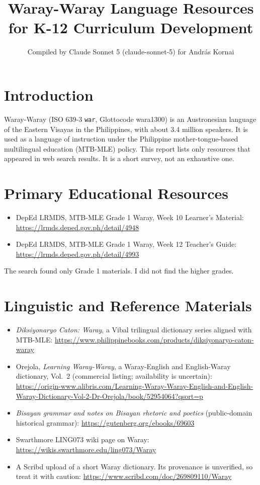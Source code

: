 \documentclass[12pt]{article}
\title{Waray-Waray Language Resources for K-12 Curriculum Development}
\author{Compiled by Claude Sonnet 5 (claude-sonnet-5) for Andr\'as Kornai}
\date{}
\begin{document}
\maketitle

\section{Introduction}
Waray-Waray (ISO 639-3 \texttt{war}, Glottocode wara1300) is an Austronesian language of the Eastern Visayas in the Philippines, with about 3.4 million speakers. It is used as a language of instruction under the Philippine mother-tongue-based multilingual education (MTB-MLE) policy. This report lists only resources that appeared in web search results. It is a short survey, not an exhaustive one.

\section{Primary Educational Resources}
\begin{itemize}
\item DepEd LRMDS, MTB-MLE Grade 1 Waray, Week 10 Learner's Material: \url{https://lrmds.deped.gov.ph/detail/4948}
\item DepEd LRMDS, MTB-MLE Grade 1 Waray, Week 12 Teacher's Guide: \url{https://lrmds.deped.gov.ph/detail/4993}
\end{itemize}
The search found only Grade 1 materials. I did not find the higher grades.

\section{Linguistic and Reference Materials}
\begin{itemize}
\item \emph{Diksiyonaryo Caton: Waray}, a Vibal trilingual dictionary series aligned with MTB-MLE: \url{https://www.philippinebooks.com/products/diksiyonaryo-caton-waray}
\item Orejola, \emph{Learning Waray-Waray}, a Waray-English and English-Waray dictionary, Vol.~2 (commercial listing; availability is uncertain): \url{https://origin-www.alibris.com/Learning-Waray-Waray-English-and-English-Waray-Dictionary-Vol-2-Dr-Orejola/book/52954064?qsort=p}
\item \emph{Bisayan grammar and notes on Bisayan rhetoric and poetics} (public-domain historical grammar): \url{https://gutenberg.org/ebooks/69603}
\item Swarthmore LING073 wiki page on Waray: \url{https://wikis.swarthmore.edu/ling073/Waray}
\item A Scribd upload of a short Waray dictionary. Its provenance is unverified, so treat it with caution: \url{https://www.scribd.com/doc/269809110/Waray}
\end{itemize}
\end{document}
